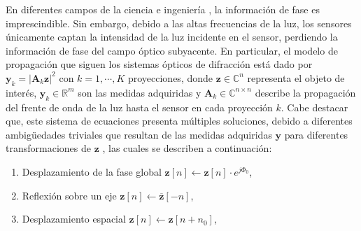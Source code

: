 En diferentes campos de la ciencia e ingeniería \cite{pinilla2018coded,fienup1987phase,rivenson2018phase}, la información de fase es imprescindible. Sin embargo, debido a las altas frecuencias de la luz, los sensores únicamente captan la intensidad de la luz incidente en el sensor, perdiendo la información de fase del campo óptico subyacente. En particular, el modelo de propagación que siguen los sistemas ópticos de difracción está dado por $\mathbf{y}_k = \vert \mathbf{A}_k\mathbf{z} \vert^2$ con $k=1,\cdots, K$ proyecciones, donde $\mathbf{z} \in {\mathbb{C}}^{n}$ representa el objeto de interés, $\mathbf{y}_k \in \mathbb{R}^{m}$ son las medidas adquiridas y $\mathbf{A}_k\in \mathbb{C}^{n \times n}$ describe la propagación del frente de onda de la luz hasta el sensor en cada proyección $k$. Cabe destacar que, este sistema de ecuaciones presenta múltiples soluciones, debido a diferentes ambigüedades triviales que resultan de las medidas adquiridas $\mathbf{y}$ para diferentes transformaciones de $\mathbf{z}$ \cite{beinert2015ambiguities,shechtman2015phase}, las cuales se describen a continuación:
\begin{enumerate}
    \item Desplazamiento de la fase global $\mathbf{z}[n] \leftarrow \mathbf{z}[n] \cdot e^{j\Phi_0}$,
    \item Reflexión sobre un eje $\mathbf{z}[n] \leftarrow \overline{\mathbf{z}}[-n]$,
    \item Desplazamiento espacial $\mathbf{z}[n] \leftarrow \mathbf{z}[n + n_0]$,
\end{enumerate}

